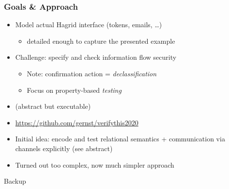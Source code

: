 \documentclass[12pt,english,dvipsnames]{beamer}
\newcommand{\code}[1]{\text{\upshape\ttfamily#1}}
\begin{document}
\begin{frame}
    \frametitle{Goals \& Approach}
    \begin{itemize}
    \item Model actual Hagrid interface (tokens, emails, \ldots) \\
        \begin{itemize}
        \item detailed enough to capture the presented example
        \end{itemize}
    \item Challenge: specify and check information flow security
        \begin{itemize}
        \item Note: confirmation action = \emph{declassification}
        \item Focus on property-based \emph{testing}
        \end{itemize}
    \item \code{Scala} (abstract but executable)
    \item \url{https://github.com/gernst/verifythis2020}
    \end{itemize}

\medskip\pause

    \begin{itemize}
    \item Initial idea: encode and test relational semantics + communication via channels explicitly (see abstract)
    \item Turned out too complex, now much simpler approach
    \end{itemize}
\end{frame}

\begin{frame}
    \centering
    Backup
\end{frame}

\appendix
\end{document}
